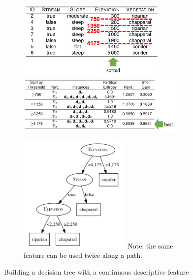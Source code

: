 \begin{figure}[H]
  \centering
  \begin{subfigure}{0.4\textwidth}
    \includegraphics[width=0.8\textwidth]{assets/trees/cont/descriptive_possible.png}

    \vspace*{0.5cm}
    \includegraphics[width=0.9\textwidth]{assets/trees/cont/descriptive_decision.png}
  \end{subfigure}
  \begin{subfigure}{0.5\textwidth}
    \centering
    \includegraphics[width=0.6\textwidth]{assets/trees/cont/descriptive_final_trees.png}
    \textcolor{black}{\footnotesize Note: the same feature can be used twice along a path.}
  \end{subfigure}
  \caption{Building a decision tree with a continuous descriptive feature}
  \label{fig:3_cont_descriptive_feature}
\end{figure}


